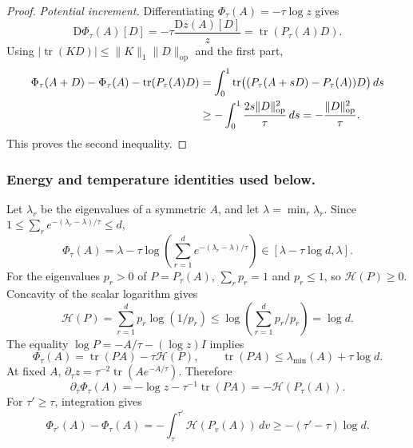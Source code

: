 \documentclass[10pt,twoside,letterpaper]{article}
\newcommand{\tr}{\operatorname{tr}}
\newcommand{\op}{\mathrm{op}}
\newcommand{\norm}[1]{\lVert #1\rVert}
\begin{document}
\begin{proof}
\textit{Potential increment.}
Differentiating $\Phi_\tau(A)=-\tau\log z$ gives
\begin{equation}
\mathrm D\Phi_\tau(A)[D]
=-\tau\frac{\mathrm Dz(A)[D]}z=\tr(P_\tau(A)D).
\label{eq:app-potential-derivative}
\end{equation}
Using $|\tr(KD)|\le\norm{K}_1\norm{D}_{\op}$ and the first part,
\begin{align}
\Phi_\tau(A+D)-\Phi_\tau(A)-\tr(P_\tau(A)D)
&=\int_0^1\tr\!\big((P_\tau(A+sD)-P_\tau(A))D\big)\,ds\notag\\
&\ge-\int_0^1\frac{2s\norm{D}_{\op}^2}{\tau}\,ds
=-\frac{\norm{D}_{\op}^2}{\tau}.
\label{eq:app-smoothness-integral}
\end{align}
This proves the second inequality.
\end{proof}

\subsubsection*{Energy and temperature identities used below.}
Let $\lambda_r$ be the eigenvalues of a symmetric $A$, and let
$\lambda=\min_r\lambda_r$. Since
$1\le\sum_r e^{-(\lambda_r-\lambda)/\tau}\le d$,
\begin{equation}
\Phi_\tau(A)
=\lambda-\tau\log\!\left(\sum_{r=1}^d
 e^{-(\lambda_r-\lambda)/\tau}\right)
\in[\lambda-\tau\log d,\lambda].
\label{eq:app-soft-min-bracket}
\end{equation}
For the eigenvalues $p_r>0$ of $P=P_\tau(A)$,
$\sum_rp_r=1$ and $p_r\le1$, so $\mathcal H(P)\ge0$.
Concavity of the scalar logarithm gives
\begin{equation}
\mathcal H(P)=\sum_{r=1}^dp_r\log(1/p_r)
\le\log\!\left(\sum_{r=1}^dp_r/p_r\right)=\log d.
\label{eq:app-entropy-bound}
\end{equation}
The equality $\log P=-A/\tau-(\log z)I$ implies
\begin{equation}
\Phi_\tau(A)=\tr(PA)-\tau\mathcal H(P),\qquad
\tr(PA)\le\lambda_{\min}(A)+\tau\log d.
\label{eq:app-gibbs-energy}
\end{equation}
At fixed $A$,
$\partial_\tau z=\tau^{-2}\tr(Ae^{-A/\tau})$. Therefore
\begin{equation}
\partial_\tau\Phi_\tau(A)
=-\log z-\tau^{-1}\tr(PA)=-\mathcal H(P_\tau(A)).
\label{eq:app-temperature-derivative}
\end{equation}
For $\tau'\ge\tau$, integration gives
\begin{equation}
\Phi_{\tau'}(A)-\Phi_\tau(A)
=-\int_\tau^{\tau'}\mathcal H(P_v(A))\,dv
\ge-(\tau'-\tau)\log d.
\label{eq:app-temp-change}
\end{equation}
\end{document}
